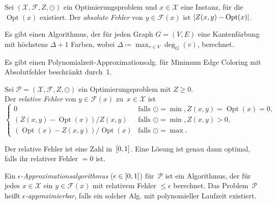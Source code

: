 \documentclass{cheat-sheet}
\newcommand{\Instances}{\mathcal{X}} %
\newcommand{\Feasible}{\mathcal{F}} %
\newcommand{\ObjFun}{Z} %
\newcommand{\Goal}{\odot} %
\newcommand{\OptTuple}{(\Instances{}, \Feasible{}, \ObjFun{}, \Goal)} %
\DeclareMathOperator{\Opt}{Opt} %
\newcommand{\Prob}{\mathcal{P}} %
\newcommand{\Youtube}[1]{\href{https://www.youtube.com/watch?v=#1}{\textcolor{YoutubeColor}{$\blacktriangleright$}}}
\newcommand{\Algorithm}[1]{\textcolor{AlgorithmColor}{\textbf{#1}}}
\begin{document}

\begin{defn}
  Sei $\OptTuple$ ein Optimierungsproblem und $x \in \Instances$ eine Instanz, für die $\Opt(x)$ existiert.
  Der \emph{absolute Fehler} von $y \in \Feasible(x)$ ist $\abs{Z(x, y) - \Opt(x)}$.
\end{defn}

\begin{satz}[\Algorithm{Vizings Algorithmus}, \Youtube{otky1bBhwgM}]
  Es gibt einen Algorithmus, der für jeden Graph $G = (V, E)$ eine Kantenfärbung mit höchstens $\Delta + 1$ Farben, wobei $\Delta \coloneqq {\max}_{v \in V} \deg_G(v)$, berechnet.
\end{satz}

\begin{kor}
  Es gibt einen Polynomialzeit-Approximationsalg. für Minimum Edge Coloring mit Absolutfehler beschränkt durch~1.
\end{kor}


\begin{defn}
  Sei $\Prob = \OptTuple$ ein Optimierungsproblem mit $Z \geq 0$. \\
  Der \emph{relative Fehler} von $y \in \Feasible(x)$ zu~$x \in \Instances$ ist
  \[
    \begin{cases}
      0 & \text{falls } \Goal = \min, \ObjFun(x, y) = \Opt(x) = 0, \\
      (\ObjFun(x, y) - \Opt(x)) / \ObjFun(x, y) & \text{falls } \Goal = \min, Z(x, y) > 0, \\
      (\Opt(x) - \ObjFun(x, y)) / \Opt(x) & \text{falls } \Goal = \max.
    \end{cases}
  \]
\end{defn}

\begin{bem}
  Der relative Fehler ist eine Zahl in~$\left[ 0, 1 \right]$.
  Eine Lösung ist genau dann optimal, falls ihr relativer Fehler $= 0$ ist.
\end{bem}

\begin{defn}
  Ein \emph{$\epsilon$-Approximationsalgorithmus} ($\epsilon \in \left[ 0, 1 \right]$) für~$\Prob$ ist ein Algorithmus, der für jedes $x \in \Instances$ ein $y \in \Feasible(x)$ mit relativem Fehler $\leq \epsilon$ berechnet.
  Das Problem~$\Prob$ heißt \emph{$\epsilon$-approximierbar}, falls ein solcher Alg. mit polynomieller Laufzeit existiert.
\end{defn}
\end{document}
